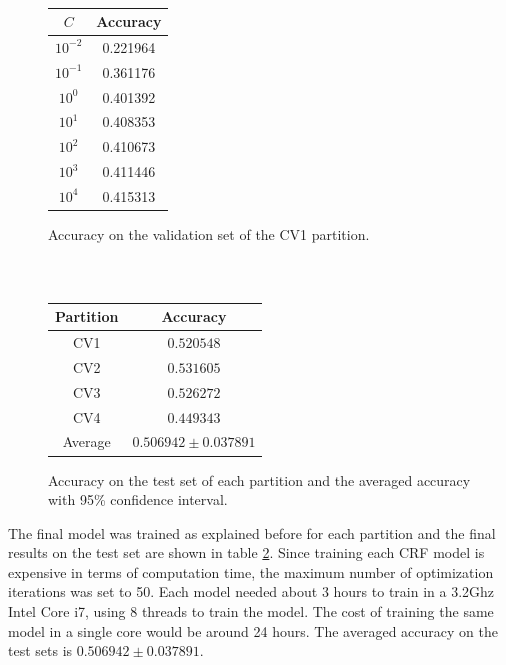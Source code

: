 \documentclass[10pt,a4paper]{article}
\begin{document}
\begin{table}[h]
\centering
\begin{subfigure}[b]{0.45\textwidth}
\centering
\begin{tabular}{|c|c|}
\hline
$C$ & Accuracy\\
\hline
$10^{-2}$ & 0.221964 \\
$10^{-1}$ & 0.361176 \\
$10^0$ & 0.401392 \\
$10^1$ & 0.408353\\
$10^2$ & 0.410673\\
$10^3$ & 0.411446\\
$10^4$ & 0.415313\\
\hline
\end{tabular}
\caption{Accuracy on the validation set of the CV1 partition.}
\label{tab:results_valid}
\end{subfigure}
~
\begin{subfigure}[b]{0.45\textwidth}
\centering
\begin{tabular}{|c|c|}
\hline
Partition & Accuracy\\
\hline
CV1 & $0.520548$\\
CV2 & $0.531605$\\
CV3 & $0.526272$\\
CV4 & $0.449343$\\
\hline
Average & $0.506942 \pm 0.037891$\\
\hline
\end{tabular}
\caption{Accuracy on the test set of each partition and the averaged accuracy with 95\% confidence interval.}
\label{tab:results_test}
\end{subfigure}
\caption{}
\end{table}

The final model was trained as explained before for each partition and the final results on the test set are shown in table \ref{tab:results_test}. Since training each CRF model is expensive in terms of computation time, the maximum number of optimization iterations was set to 50. Each model needed about 3 hours to train in a 3.2Ghz Intel Core i7, using 8 threads to train the model. The cost of training the same model in a single core would be around 24 hours. The averaged accuracy on the test sets is $\mathbf{0.506942 \pm 0.037891}$.
\end{document}
